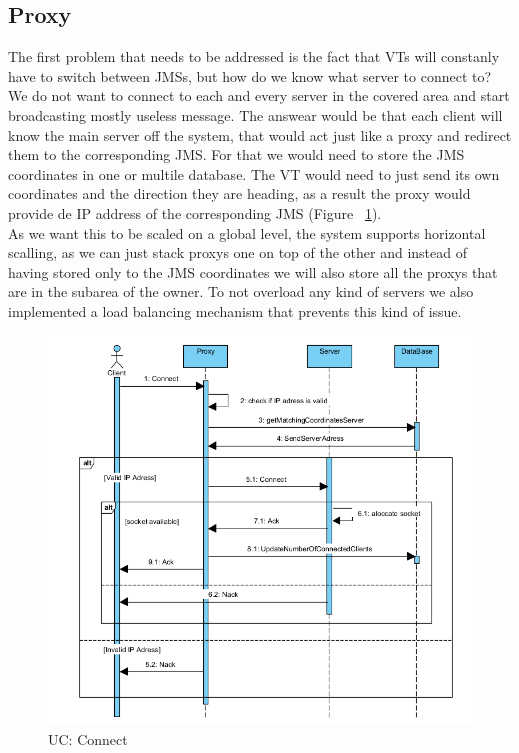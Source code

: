 \documentclass[17pt]{article}
\begin{document}
\subsection{Proxy}
\indent \indent
The first problem that needs to be addressed is the fact that VTs will 
constanly have to switch between JMSs, but how do we know what server to 
connect to? We do not want to connect to each and every server in the 
covered area and start broadcasting mostly useless message. The answear
would be that each client will know the main server off the system, that
would act just like a proxy and redirect them to the corresponding JMS.
For that we would need to store the JMS coordinates in one or multile
database. The VT would need to just send its own coordinates and the
direction they are heading, as a result the proxy would provide de IP
address of the corresponding JMS (Figure ~\ref{fig:UC_Connect}).\\
\indent \indent
As we want this to be scaled on a global level, the system supports
horizontal scalling, as we can just stack proxys one on top of the 
other and instead of having stored only to the JMS coordinates we 
will also store all the proxys that are in the subarea of the owner. To 
not overload any kind of servers we also implemented a load balancing
mechanism that prevents this kind of issue.
\begin{figure}[h!]
    \includegraphics[width=\textwidth]{UC/Connect.png}
    \caption{UC: Connect}
    \label{fig:UC_Connect}
\end{figure}
\end{document}
